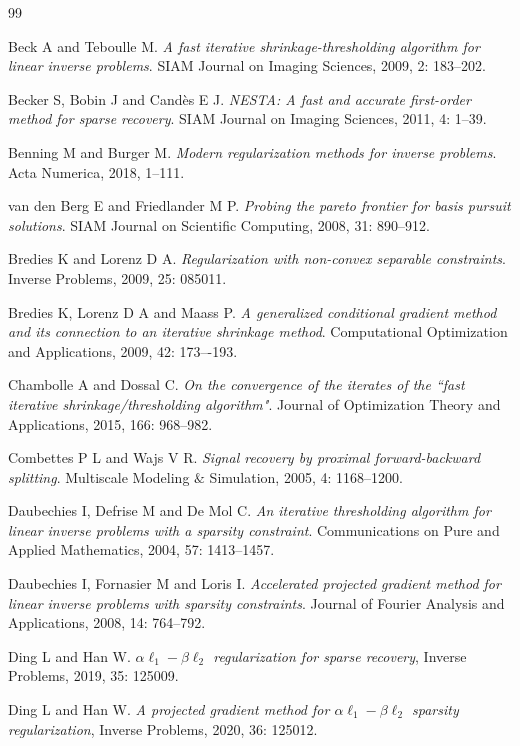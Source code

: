 \documentclass[a4paper,12pt]{article}
\numberwithin{equation}{section}
\begin{document}
\begin{thebibliography}{99}

Beck A and Teboulle M. \emph{A fast iterative shrinkage-thresholding algorithm for linear inverse problems}. SIAM Journal on Imaging Sciences, 2009, 2:  183--202.

Becker S, Bobin J and Candès E J. \emph{NESTA: A fast and accurate first-order method for sparse recovery}. SIAM Journal on Imaging Sciences, 2011, 4: 1--39.

Benning M and Burger M. \emph{Modern regularization methods for inverse problems}. Acta Numerica, 2018, 1--111.

van den Berg E and Friedlander M P. \emph{Probing the pareto frontier for basis pursuit solutions}. SIAM Journal on Scientific Computing, 2008, 31: 890--912.

Bredies K and Lorenz D A. \emph{Regularization with non-convex separable constraints}. Inverse Problems, 2009, 25: 085011.

Bredies K, Lorenz D A and Maass P. \emph{A generalized conditional gradient method and its connection to an iterative shrinkage method}. Computational Optimization and Applications, 2009, 42: 173–-193.

Chambolle A and Dossal C. \emph{On the convergence of the iterates of the ``fast iterative shrinkage/thresholding algorithm"}. Journal of Optimization Theory and Applications, 2015, 166: 968--982.

Combettes P L and Wajs V R. \emph{Signal recovery by proximal forward-backward splitting}. Multiscale Modeling $\&$ Simulation, 2005, 4: 1168--1200.

Daubechies I, Defrise M and De Mol C. \emph{An iterative thresholding algorithm for linear inverse problems with a sparsity constraint}. Communications on Pure and Applied Mathematics, 2004, 57: 1413--1457.

Daubechies I, Fornasier M and Loris I. \emph{Accelerated projected gradient method for linear inverse problems with sparsity constraints}. Journal of Fourier Analysis and Applications, 2008, 14: 764--792.

Ding L and Han W. \emph{$\alpha\ell_{1}-\beta\ell_{2}$ regularization for sparse recovery}, Inverse Problems, 2019, 35: 125009.

Ding L and Han W. \emph{A projected gradient method for $\alpha\ell_{1}-\beta\ell_{2}$ sparsity regularization}, Inverse Problems, 2020, 36: 125012.


\end{thebibliography}
\end{document}
